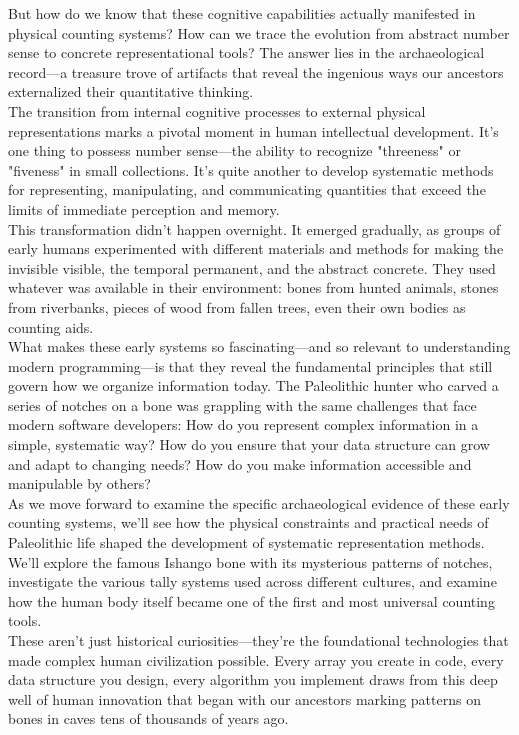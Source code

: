 But how do we know that these cognitive capabilities actually manifested in physical counting systems? How can we trace the evolution from abstract number sense to concrete representational tools? The answer lies in the archaeological record—a treasure trove of artifacts that reveal the ingenious ways our ancestors externalized their quantitative thinking.\\
The transition from internal cognitive processes to external physical representations marks a pivotal moment in human intellectual development. It's one thing to possess number sense—the ability to recognize "threeness" or "fiveness" in small collections. It's quite another to develop systematic methods for representing, manipulating, and communicating quantities that exceed the limits of immediate perception and memory.\\
This transformation didn't happen overnight. It emerged gradually, as groups of early humans experimented with different materials and methods for making the invisible visible, the temporal permanent, and the abstract concrete. They used whatever was available in their environment: bones from hunted animals, stones from riverbanks, pieces of wood from fallen trees, even their own bodies as counting aids.\\
What makes these early systems so fascinating—and so relevant to understanding modern programming—is that they reveal the fundamental principles that still govern how we organize information today. The Paleolithic hunter who carved a series of notches on a bone was grappling with the same challenges that face modern software developers: How do you represent complex information in a simple, systematic way? How do you ensure that your data structure can grow and adapt to changing needs? How do you make information accessible and manipulable by others?\\
As we move forward to examine the specific archaeological evidence of these early counting systems, we'll see how the physical constraints and practical needs of Paleolithic life shaped the development of systematic representation methods. We'll explore the famous Ishango bone with its mysterious patterns of notches, investigate the various tally systems used across different cultures, and examine how the human body itself became one of the first and most universal counting tools.\\
These aren't just historical curiosities—they're the foundational technologies that made complex human civilization possible. Every array you create in code, every data structure you design, every algorithm you implement draws from this deep well of human innovation that began with our ancestors marking patterns on bones in caves tens of thousands of years ago.\newpagea
